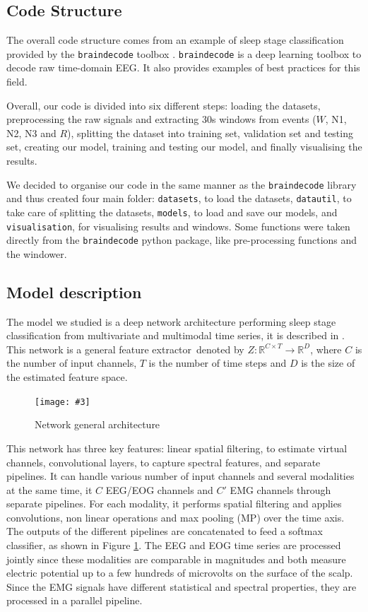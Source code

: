 \documentclass[titlepage, 11pt, a4paper, fancysections]{article}
\newcommand{\fig}[5]{\begin{figure}[#1] \centering \texttt{[image: \#3]} \caption{#4} \label{#5} \end{figure}}
\begin{document}
\subsection{Code Structure}
The overall code structure comes from an example of sleep stage classification provided by the \texttt{braindecode} toolbox \autocite{braindecode}. \texttt{braindecode} is a deep learning toolbox to decode raw time-domain EEG. It also provides examples of best practices for this field. 

Overall, our code is divided into six different steps: loading the datasets, preprocessing the raw signals and extracting 30s windows from events ($W$, N1, N2, N3 and $R$), splitting the dataset into training set, validation set and testing set, creating our model, training and testing our model, and finally visualising the results. 

We decided to organise our code in the same manner as the \texttt{braindecode} library and thus created four main folder: \texttt{datasets}, to load the datasets, \texttt{datautil}, to take care of splitting the datasets, \texttt{models}, to load and save our models, and \texttt{visualisation}, for visualising results and windows. Some functions were taken directly from the \texttt{braindecode} python package, like pre-processing functions and the windower.

\subsection{Model description}

The model we studied is a deep network architecture performing sleep stage classification from multivariate and multimodal time series, it is described in \autocite{chambon-sleep-scoring}. This network is a general feature extractor\, denoted by $Z: \mathbb{R}^{C \times T} \rightarrow \mathbb{R}^D$, where $C$ is the number of input channels, $T$ is the number of time steps and $D$ is the size of the estimated feature space. 

\fig{ht!}{0.7\linewidth}{model/scheme.png}{Network general architecture}{fig:pipeline}

This network has three key features: linear spatial filtering, to estimate virtual channels, convolutional layers, to capture spectral features, and separate pipelines. It can handle various number of input channels and several modalities at the same time, it $C$ EEG/EOG channels and $C\prime$ EMG channels through separate pipelines. For each modality, it performs spatial filtering and applies convolutions, non linear operations and max pooling (MP) over the time axis. The outputs of the different pipelines are concatenated to feed a softmax classifier, as shown in Figure \ref{fig:pipeline}. The EEG and EOG time series are processed jointly since these modalities are comparable in magnitudes and both measure electric potential up to a few hundreds of microvolts on the surface of the scalp. Since the EMG signals have different statistical and spectral properties, they are processed in a parallel pipeline.
\end{document}
